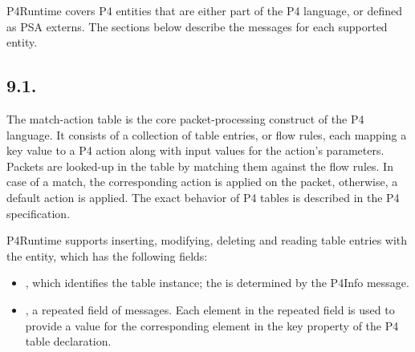 \documentclass[11pt]{article}
\begin{document}
{%
\noindent{}P4Runtime covers P4 entities that are either part of the P4 language, or
defined as PSA externs. The sections below describe the messages for each
supported entity.%

\subsection{9.1.\hspace*{0.5em}}\label{sec-table-entry}%

\noindent{}The match-action table is the core packet-processing construct of the P4
language. It consists of a collection of table entries, or flow rules, each
mapping a key value to a P4 action along with input values for the action's
parameters. Packets are looked-up in the table by matching them against the flow
rules. In case of a match, the corresponding action is applied on the packet,
otherwise, a default action is applied. The exact behavior of P4 tables is
described in the P4 specification.%

P4Runtime supports inserting, modifying, deleting and reading table entries with
the  entity, which has the following fields:%

\begin{itemize}%

\item{}
, which identifies the table instance; the  is determined
by the P4Info message.%

\item{}
, a repeated field of  messages. Each element in the
repeated field is used to provide a value for the corresponding element in the
key property of the P4 table declaration.%


\end{itemize}}
\end{document}
